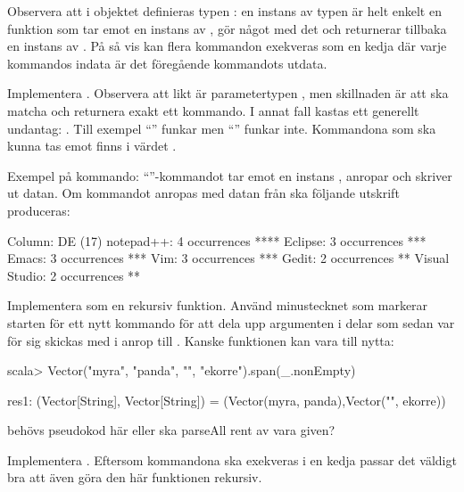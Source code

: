 Observera att i objektet  definieras typen : en instans av typen  är helt enkelt en funktion som tar emot en instans av , gör något med det och returnerar tillbaka en instans av . På så vis kan flera kommandon exekveras som en kedja där varje kommandos indata är det föregående kommandots utdata.

\Subtask Implementera . Observera att likt  är parametertypen , men skillnaden är att  ska matcha och returnera exakt ett kommando. I annat fall kastas ett generellt undantag: . Till exempel ``'' funkar men ``'' funkar inte. Kommandona som ska kunna tas emot finns i värdet .

Exempel på kommando: ``''-kommandot tar emot en instans , anropar  och skriver ut datan. Om kommandot anropas med datan från  ska följande utskrift produceras:
\begin{REPLnonum}
Column: DE (17)
notepad++: 4 occurrences
****
Eclipse: 3 occurrences
***
Emacs: 3 occurrences
***
Vim: 3 occurrences
***
Gedit: 2 occurrences
**
Visual Studio: 2 occurrences
**

\end{REPLnonum}

\Subtask Implementera  som en rekursiv funktion. Använd minustecknet som markerar starten för ett nytt kommando för att dela upp argumenten  i delar som sedan var för sig skickas med i anrop till . Kanske funktionen  kan vara till nytta:
\begin{REPLnonum}
scala> Vector("myra", "panda", "", "ekorre").span(_.nonEmpty)

res1: (Vector[String], Vector[String]) = (Vector(myra, panda),Vector("", ekorre))
\end{REPLnonum}
\TODO behövs pseudokod här eller ska parseAll rent av vara given?


\Subtask Implementera . Eftersom kommandona ska exekveras i en kedja passar det väldigt bra att även göra den här funktionen rekursiv.

